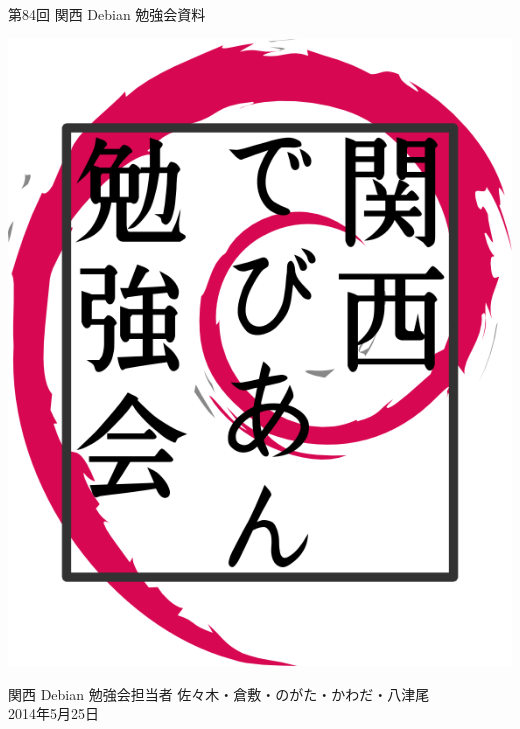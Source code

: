 \documentclass[mingoth,a4paper]{jsarticle}
\newcommand{\debmtgyear}{2014}
\newcommand{\debmtgdate}{25}
\newcommand{\debmtgmonth}{5}
\newcommand{\debmtgnumber}{84}
\begin{document}
\begin{titlepage}


 第\debmtgnumber{}回 関西 Debian 勉強会資料

\vspace{2cm}

\begin{center}
\includegraphics{image200802/kansaidebianlogo.png}
\end{center}

\begin{flushright}
\hfill{}関西 Debian 勉強会担当者 佐々木・倉敷・のがた・かわだ・八津尾 \\
\hfill{}\debmtgyear{}年\debmtgmonth{}月\debmtgdate{}日
\end{flushright}

\thispagestyle{empty}
\end{titlepage}


\vspace{1em}
\end{document}
